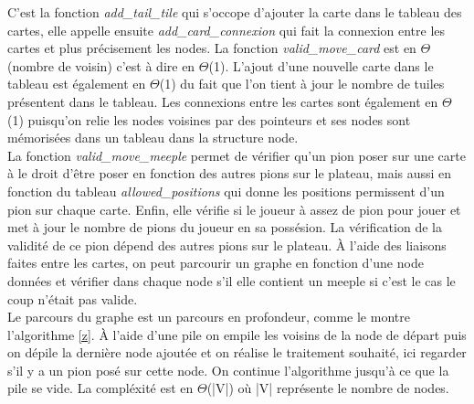 \documentclass[12pt]{article}
\begin{document}
C'est la fonction \textit{add\_tail\_tile} qui s'occope d'ajouter la carte dans le tableau des cartes, elle appelle ensuite \textit{add\_card\_connexion} qui fait la connexion entre les cartes et plus précisement les nodes. La fonction \textit{valid\_move\_card} est en $\Theta$(nombre de voisin) c'est à dire en $\Theta$(1). L'ajout d'une nouvelle carte dans le tableau est également en $\Theta$(1) du fait que l'on tient à jour le nombre de tuiles présentent dans le tableau. Les connexions entre les cartes sont également en $\Theta$(1) puisqu'on relie les nodes voisines par des pointeurs et ses nodes sont mémorisées dans un tableau dans la structure node.\\

La fonction \textit{valid\_move\_meeple} permet de vérifier qu'un pion poser sur une carte à le droit d'être poser en fonction des autres pions sur le plateau, mais aussi en fonction du tableau \textit{allowed\_positions} qui donne les positions permissent d'un pion sur chaque carte. Enfin, elle vérifie si le joueur à assez de pion pour jouer et met à jour le nombre de pions du joueur en sa possésion. La vérification de la validité de ce pion dépend des autres pions sur le plateau. À l'aide des liaisons faites entre les cartes, on peut parcourir un graphe en fonction d'une node données et vérifier dans chaque node s'il elle contient un meeple si c'est le cas le coup n'était pas valide.\\
Le parcours du graphe est un parcours en profondeur, comme le montre l'algorithme \ref{z}.
À l'aide d'une pile on empile les voisins de la node de départ puis on dépile la dernière node ajoutée et on réalise le traitement souhaité, ici regarder s'il y a un pion posé sur cette node. On continue l'algorithme jusqu'à ce que la pile se vide. La compléxité est en $\Theta$(|V|) où |V| représente le nombre de nodes.
\end{document}
